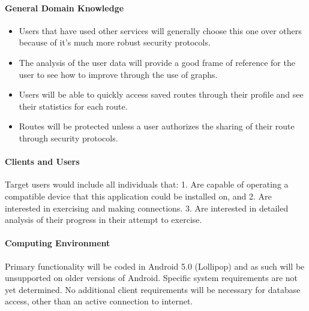 \documentclass{article}
\begin{document}
\paragraph{General Domain Knowledge}
\begin{itemize}
    \item Users that have used other services will generally choose this one over others because of it’s much more robust security protocols.
    \item The analysis of the user data will provide a good frame of reference for the user to see how to improve through the use of graphs.
    \item Users will be able to quickly access saved routes through their profile and see their statistics for each route.
    \item Routes will be protected unless a user authorizes the sharing of their route through security protocols.
\end{itemize}

\paragraph{Clients and Users}
Target users would include all individuals that: 1. Are capable of operating a compatible device that this application could be installed on, and 2. Are interested in exercising and making connections. 3. Are interested in detailed analysis of their progress in their attempt to exercise.

\paragraph{Computing Environment}
Primary functionality will be coded in Android 5.0 (Lollipop) and as such will be unsupported on older versions of Android. Specific system requirements are not yet determined. No additional client requirements will be necessary for database access, other than an active connection to internet.
\end{document}
